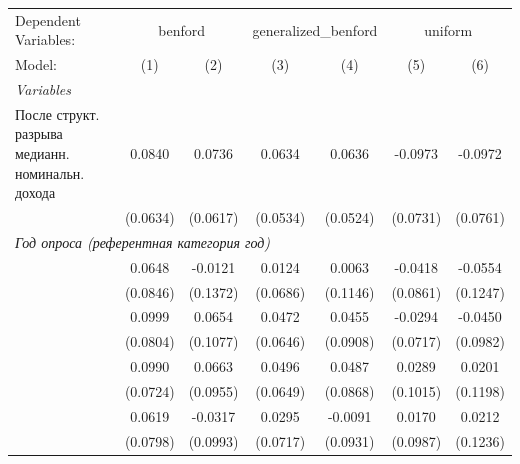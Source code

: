 
\begingroup
\centering
\begin{tabular}{lcccccc}
   \tabularnewline \midrule \midrule
   Dependent Variables: & \multicolumn{2}{c}{benford} & \multicolumn{2}{c}{generalized\_benford} & \multicolumn{2}{c}{uniform}\\
   Model:                           & (1)                   & (2)             & (3)                   & (4)             & (5)            & (6)\\  
   \midrule
   \emph{Variables}\\
   После структ. разрыва медианн. номинальн. дохода          & 0.0840                & 0.0736          & 0.0634                & 0.0636          & -0.0973        & -0.0972\\   
                                    & (0.0634)              & (0.0617)        & (0.0534)              & (0.0524)        & (0.0731)       & (0.0761)\\   
\multicolumn{7}{l}{\emph{Год опроса (референтная категория \textemdash 2009 год)}} \\
   \qquad 2000                    & 0.0648                & -0.0121         & 0.0124                & 0.0063          & -0.0418        & -0.0554\\   
                                    & (0.0846)              & (0.1372)        & (0.0686)              & (0.1146)        & (0.0861)       & (0.1247)\\   
   \qquad 2001                    & 0.0999                & 0.0654          & 0.0472                & 0.0455          & -0.0294        & -0.0450\\   
                                    & (0.0804)              & (0.1077)        & (0.0646)              & (0.0908)        & (0.0717)       & (0.0982)\\   
   \qquad 2002                    & 0.0990                & 0.0663          & 0.0496                & 0.0487          & 0.0289         & 0.0201\\   
                                    & (0.0724)              & (0.0955)        & (0.0649)              & (0.0868)        & (0.1015)       & (0.1198)\\   
   \qquad 2003                    & 0.0619                & -0.0317         & 0.0295                & -0.0091         & 0.0170         & 0.0212\\   
                                    & (0.0798)              & (0.0993)        & (0.0717)              & (0.0931)        & (0.0987)       & (0.1236)\\   

\end{tabular}

